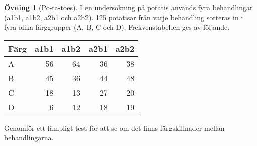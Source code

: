 \documentclass[
]{book}
\theoremstyle{definition}
\theoremstyle{definition}
\theoremstyle{definition}
\newtheorem{exercise}{Övning}[chapter]
\theoremstyle{definition}
\theoremstyle{remark}
\begin{document}
\begin{exercise}[Po-ta-toes]
I en undersökning på potatis används fyra behandlingar (a1b1, a1b2, a2b1 och a2b2). 125 potatisar från varje behandling sorteras in i fyra olika färggrupper (A, B, C och D). Frekvenstabellen ges av följande.

\begin{table}
\centering
\begin{tabular}[t]{lrrrr}
\toprule
Färg & a1b1 & a1b2 & a2b1 & a2b2\\
\midrule
A & 56 & 64 & 36 & 38\\
B & 45 & 36 & 44 & 48\\
C & 18 & 13 & 27 & 20\\
D & 6 & 12 & 18 & 19\\
\bottomrule
\end{tabular}
\end{table}

Genomför ett lämpligt test för att se om det finns färgskillnader mellan behandlingarna.
\end{exercise}
\end{document}
